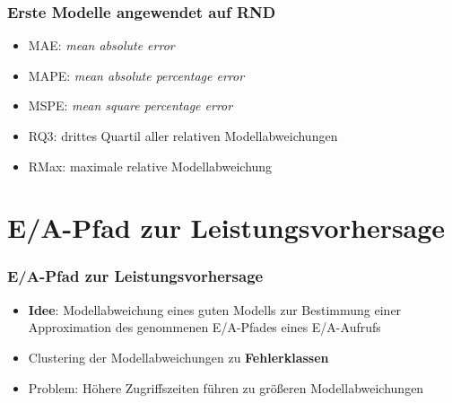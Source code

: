 \documentclass{beamer}
\begin{document}
\begin{frame}
\frametitle{Erste Modelle angewendet auf RND}
\begin{table}
\end{table}
\begin{itemize}
\item MAE: \textit{mean absolute error}
\item MAPE: \textit{mean absolute percentage error}
\item MSPE: \textit{mean square percentage error}
\item RQ3: drittes Quartil aller relativen Modellabweichungen
\item RMax: maximale relative Modellabweichung
\end{itemize}
\end{frame}

\section{E/A-Pfad zur Leistungsvorhersage}
\begin{frame}
\frametitle{E/A-Pfad zur Leistungsvorhersage}
\begin{itemize}
	\item \textbf{Idee}: Modellabweichung eines guten Modells zur Bestimmung einer Approximation des genommenen E/A-Pfades eines E/A-Aufrufs
	\item Clustering der Modellabweichungen zu \textbf{Fehlerklassen} 
	\item Problem: Höhere Zugriffszeiten führen zu größeren Modellabweichungen
\end{itemize}
\end{frame}
\end{document}
